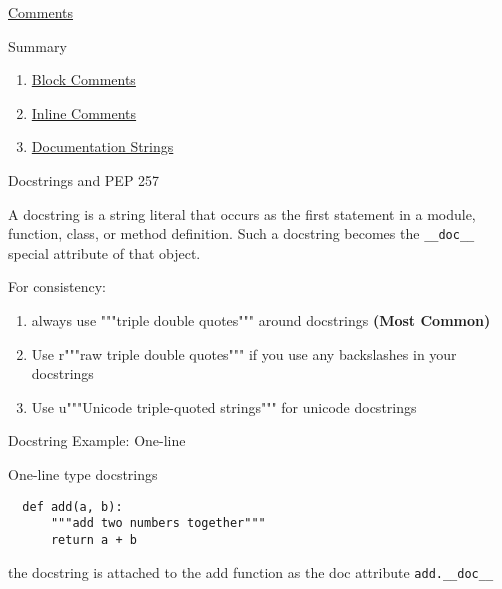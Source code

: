 \documentclass{beamer}
\begin{document}
\begin{frame}{\href{https://www.python.org/dev/peps/pep-0008/\#comments}{Comments}}

Summary

\begin{enumerate}
\item \href{https://www.python.org/dev/peps/pep-0008/\#block-comments}{Block Comments}
\item \href{https://www.python.org/dev/peps/pep-0008/\#inline-comments}{Inline Comments}
\item \href{https://www.python.org/dev/peps/pep-0008/\#documentation-strings}{Documentation Strings}
\end{enumerate}

\end{frame}



\begin{frame}{Docstrings and PEP 257}

A docstring is a string literal that occurs as the first statement in a module, function, class, 
or method definition. Such a docstring becomes the \texttt{__doc__} special attribute of that object.

  For consistency:

  \begin{enumerate}
    \item always use """triple double quotes""" around docstrings \textbf{(Most Common)}
    \item Use r"""raw triple double quotes""" if you use any backslashes in your docstrings 
    \item Use u"""Unicode triple-quoted strings""" for unicode docstrings
  \end{enumerate}

\end{frame}

\begin{frame}[fragile]{Docstring Example: One-line}

  One-line type docstrings

  \begin{verbatim}
  def add(a, b):
      """add two numbers together"""
      return a + b
  \end{verbatim}

the docstring is attached to the add function as the doc attribute \texttt{add.__doc__}

\end{frame}
\end{document}
